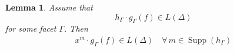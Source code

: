 \documentclass[12pt, english]{article}
\newtheorem{lemma}[definition]{Lemma}
\DeclareMathOperator{\Supp}{Supp}
\begin{document}

\begin{lemma} \label{lemma_proof_ITT_just_one_supp}
	Assume that
	\[ h_{\Gamma} \cdot g_{\Gamma}(f) \in L(\Delta)  \]
	for some facet $\Gamma$. Then 
	\begin{align} \label{formula_support_h_Gamma_other_normal_vectors_3}
		x^m \cdot g_{\Gamma}(f) \in L(\Delta) \quad \forall \, m \in \Supp(h_{\Gamma})
	\end{align}
\end{lemma}
\end{document}
